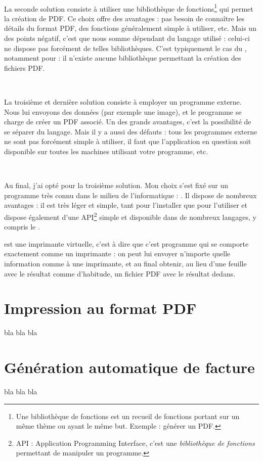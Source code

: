 ~

La seconde solution consiste à utiliser une bibliothèque de fonctions\footnote{Une bibliothèque de fonctions est un recueil de fonctions portant sur un même thème ou ayant le même but. Exemple : générer un PDF.} qui permet la création de PDF. Ce choix offre des avantages : pas besoin de connaître les détails du format PDF, des fonctions généralement simple à utiliser, etc. Mais un des points négatif, c'est que nous somme dépendant du langage utilisé : celui-ci ne dispose pas forcément de telles bibliothèques. C'est typiquement le cas du \vb, notamment pour  : il n'existe aucune bibliothèque permettant la création des fichiers PDF.

~

La troisième et dernière solution consiste à employer un programme externe. Nous lui envoyons des données (par exemple une image), et le programme se charge de créer un PDF associé. Un des grands avantages, c'est la possibilité de se séparer du langage. Mais il y a aussi des défauts : tous les programmes externe ne sont pas forcément simple à utiliser, il faut que l'application en question soit disponible sur toutes les machines utilisant votre programme, etc.

~

Au final, j'ai opté pour la troisième solution. Mon choix s'est fixé sur un programme très connu dans le milieu de l'informatique : \pdfcreator. Il dispose de nombreux avantages : il est très léger et simple, tant pour l'installer que pour l'utiliser et dispose également d'une API\footnote{API : Application Programming Interface, c'est une \emph{bibliothèque de fonctions} permettant de manipuler un programme.} simple et disponible dans de nombreux langages, y compris le \vb.

\pdfcreator{} est une imprimante virtuelle, c'est à dire que c'est programme qui se comporte exactement comme un imprimante : on peut lui envoyer n'importe quelle information comme à une imprimante, et au final obtenir, au lieu d'une feuille avec le résultat comme d'habitude, un fichier PDF avec le résultat dedans.

\section{Impression au format PDF}
bla bla bla

\section{Génération automatique de facture}
bla bla bla
